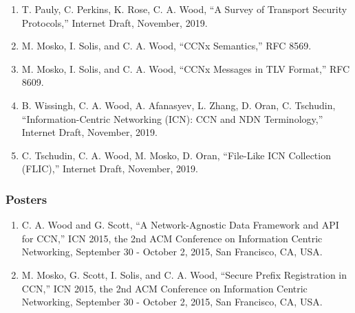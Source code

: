 \documentclass[10pt]{res}
\begin{document}
\begin{resume}
\begin{enumerate}[D-1.]
    \item T. Pauly, C. Perkins, K. Rose, C. A. Wood, ``A Survey of Transport Security Protocols,'' Internet Draft, November, 2019.
    \item M. Mosko, I. Solis, and C. A. Wood, ``CCNx Semantics,'' RFC 8569.
    \item M. Mosko, I. Solis, and C. A. Wood, ``CCNx Messages in TLV Format,'' RFC 8609.
    \item B. Wissingh, C. A. Wood, A. Afanasyev, L. Zhang, D. Oran, C. Tschudin, ``Information-Centric Networking (ICN): CCN and NDN Terminology,'' Internet Draft, November, 2019.
    \item C. Tschudin, C. A. Wood, M. Mosko, D. Oran, ``File-Like ICN Collection (FLIC),'' Internet Draft, November, 2019.
\end{enumerate}

\vspace{-15pt}
\subsubsection*{Posters}
\begin{enumerate}[P-1.]
	\item C. A. Wood and G. Scott, ``A Network-Agnostic Data Framework and API for CCN,'' ICN 2015, the 2nd ACM Conference on Information Centric Networking, September 30 - October 2, 2015, San Francisco, CA, USA.

	\item M. Mosko, G. Scott, I. Solis, and C. A. Wood, ``Secure Prefix Registration in CCN,'' ICN 2015, the 2nd ACM Conference on Information Centric Networking, September 30 - October 2, 2015, San Francisco, CA, USA.
\end{enumerate}


\end{resume}
\end{document}
